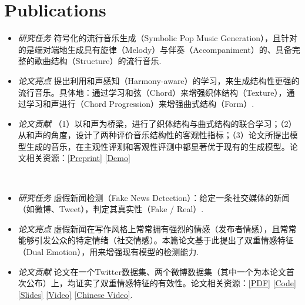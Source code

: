 \documentclass{resume}
\begin{document}
\section{Publications}
\textbf{\large {}}
{\small {}
}
\small
\begin{itemize}
  \item \textit{研究任务} \quad 符号化的流行音乐生成（Symbolic Pop Music Generation），且针对的是端对端地生成具有旋律（Melody）与伴奏（Accompaniment）的、具备完整的歌曲结构（Structure）的流行音乐.
  \item \textit{论文亮点} \quad 提出利用和声感知（Harmony-aware）的学习，来生成结构性更强的流行音乐。具体地：通过学习和弦（Chord）来增强织体结构（Texture），通过学习和声进行（Chord Progression）来增强曲式结构（Form）.
  \item \textit{论文贡献} \quad （1）以和声为桥梁，进行了织体结构与曲式结构的联合学习；（2）从和声的角度，设计了两种评价音乐结构性的客观性指标；（3）论文所提出模型生成的音乐，在主观性评测和客观性评测中都显著优于现有的生成模型。论文相关资源：\href{https://arxiv.org/pdf/2109.06441.pdf}{[Preprint]} \href{https://drive.google.com/drive/folders/1NUJIocNp_RnOeKBj3h_G6_eZcWl8Duqn?usp=sharing}{[Demo]}
\end{itemize}

\textbf{\\ \large {}}

{\small {}
}
\small
\begin{itemize}
  \item \textit{研究任务} \quad 虚假新闻检测（Fake News Detection）：给定一条社交媒体的新闻（如微博、Tweet），判定其真实性（Fake / Real）.
  \item \textit{论文亮点} \quad 虚假新闻在写作风格上常常拥有强烈的情感（发布者情感），且常常能够引发公众的特定情绪（社交情感）。本篇论文基于此提出了双重情感特征（Dual Emotion），用来增强现有模型的检测能力.
  \item \textit{论文贡献} \quad 论文在一个Twitter数据集、两个微博数据集（其中一个为本论文首次公布）上，均证实了双重情感特征的有效性。论文相关资源：\href{https://www.zhangxueyao.com/data/www2021-dual-emotion-paper.pdf}{[PDF]} \href{https://github.com/RMSnow/WWW2021}{[Code]} \href{https://www.zhangxueyao.com/assets/www2021-dual-emotion-slides.pdf}{[Slides]} \href{https://www.zhangxueyao.com/assets/www2021-dual-emotion-video.mp4}{[Video]} \href{https://www.bilibili.com/video/BV13o4y1m7c3}{[Chinese Video]}.
\end{itemize}
\end{document}
